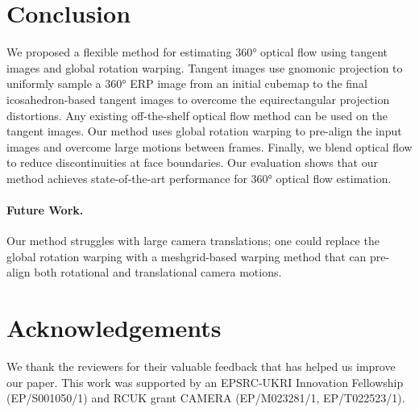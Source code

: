 \section{Conclusion}

We proposed a flexible method for estimating 360° optical flow using tangent images and global rotation warping.
Tangent images use gnomonic projection to uniformly sample a 360° ERP image from an initial cubemap to the final icosahedron-based tangent images to overcome the equirectangular projection distortions.
Any existing off-the-shelf optical flow method can be used on the tangent images.
Our method uses global rotation warping to pre-align the input images and overcome large motions between frames.
Finally, we blend optical flow to reduce discontinuities at face boundaries.
Our evaluation shows that our method achieves state-of-the-art performance for 360° optical flow estimation.



\vspace{-1em}


\vspace{-1em}
\paragraph{Future Work.}
Our method struggles with large camera translations; one could replace the global rotation warping with a meshgrid-based warping method that can pre-align both rotational and translational camera motions.


\section*{Acknowledgements}
We thank the reviewers for their valuable feedback that has helped us improve our paper.
This work was supported by an EPSRC-UKRI Innovation Fellowship (EP/S001050/1) and RCUK grant CAMERA (EP/M023281/1, EP/T022523/1).
